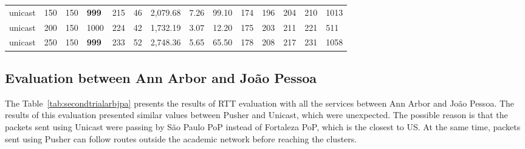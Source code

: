 \begin{table}[!htb]
\begin{tabular}{llllllllllllll}
		unicast & 150          & 150   & \textbf{999}  & 215   & 46   & 2,079.68      & 7.26     & 99.10    & 174  & 196  & 204   & 210   & 1013  \\
		unicast & 200          & 150   & 1000 & 224   & 42   & 1,732.19      & 3.07     & 12.20    & 175  & 203  & 211   & 221   & 511   \\
		unicast & 250          & 150   & \textbf{999}  & 233   & 52   & 2,748.36      & 5.65     & 65.50    & 178  & 208  & 217   & 231   & 1058 \\ \bottomrule
	\end{tabular}
\end{table} 


\subsection*{Evaluation between Ann Arbor and João Pessoa} 

The Table~\ref{tab:secondtrialarbjpa} presents the results of RTT evaluation with all the services between Ann Arbor and João Pessoa.
The results of this evaluation presented similar values between Pusher and Unicast, which were unexpected.
The possible reason is that the packets sent using Unicast were passing by São Paulo PoP instead of Fortaleza PoP, which is the closest to US.
At the same time, packets sent using Pusher can follow routes outside the academic network before reaching the clusters.

